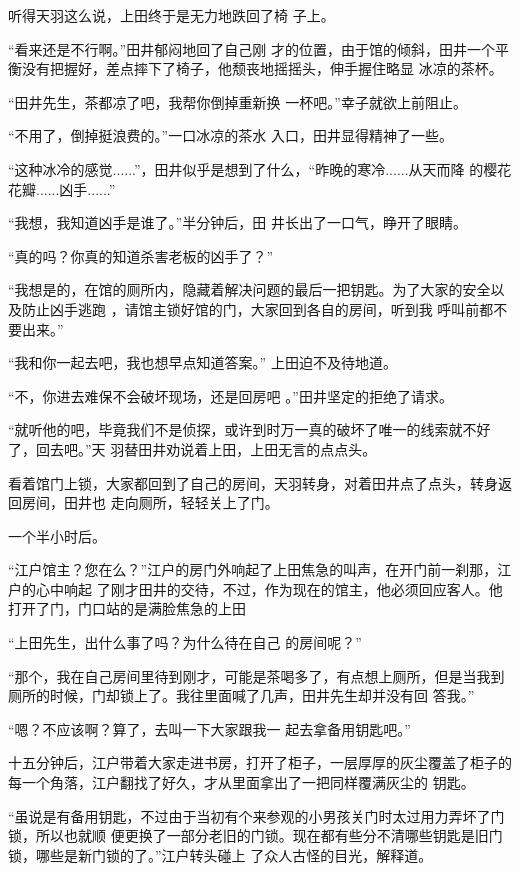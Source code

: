 \documentclass{article}
\begin{document}
听得天羽这么说，上田终于是无力地跌回了椅
子上。 

“看来还是不行啊。”田井郁闷地回了自己刚
\newpage
才的位置，由于馆的倾斜，田井一个平衡没有把握好，差点摔下了椅子，他颓丧地摇摇头，伸手握住略显
冰凉的茶杯。 

“田井先生，茶都凉了吧，我帮你倒掉重新换
一杯吧。”幸子就欲上前阻止。 

“不用了，倒掉挺浪费的。”一口冰凉的茶水
入口，田井显得精神了一些。 

“这种冰冷的感觉......”，田井似乎是想到了什么，“昨晚的寒冷......从天而降
的樱花花瓣......凶手......” 

“我想，我知道凶手是谁了。”半分钟后，田
井长出了一口气，睁开了眼睛。 

“真的吗？你真的知道杀害老板的凶手了？”

“我想是的，在馆的厕所内，隐藏着解决问题的最后一把钥匙。为了大家的安全以及防止凶手逃跑
\newpage
，请馆主锁好馆的门，大家回到各自的房间，听到我
呼叫前都不要出来。” 

“我和你一起去吧，我也想早点知道答案。”
上田迫不及待地道。 

“不，你进去难保不会破坏现场，还是回房吧
。”田井坚定的拒绝了请求。 

“就听他的吧，毕竟我们不是侦探，或许到时万一真的破坏了唯一的线索就不好了，回去吧。”天
羽替田井劝说着上田，上田无言的点点头。 

看着馆门上锁，大家都回到了自己的房间，天羽转身，对着田井点了点头，转身返回房间，田井也
走向厕所，轻轻关上了门。 


一个半小时后。 

“江户馆主？您在么？”江户的房门外响起了上田焦急的叫声，在开门前一刹那，江户的心中响起
\newpage
了刚才田井的交待，不过，作为现在的馆主，他必须回应客人。他打开了门，门口站的是满脸焦急的上田

“上田先生，出什么事了吗？为什么待在自己
的房间呢？” 

“那个，我在自己房间里待到刚才，可能是茶喝多了，有点想上厕所，但是当我到厕所的时候，门却锁上了。我往里面喊了几声，田井先生却并没有回
答我。” 

“嗯？不应该啊？算了，去叫一下大家跟我一
起去拿备用钥匙吧。” 

十五分钟后，江户带着大家走进书房，打开了柜子，一层厚厚的灰尘覆盖了柜子的每一个角落，江户翻找了好久，才从里面拿出了一把同样覆满灰尘的
钥匙。 

“虽说是有备用钥匙，不过由于当初有个来参观的小男孩关门时太过用力弄坏了门锁，所以也就顺
\newpage
便更换了一部分老旧的门锁。现在都有些分不清哪些钥匙是旧门锁，哪些是新门锁的了。”江户转头碰上
了众人古怪的目光，解释道。 
\end{document}
